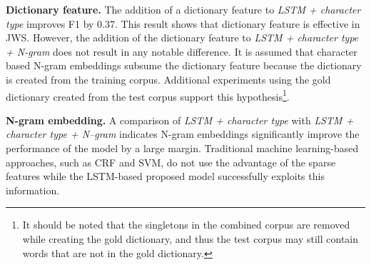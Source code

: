 \documentclass[11pt,letterpaper]{article}
\begin{document}
\noindent
{\bf Dictionary feature.} The addition of a dictionary feature to {\it LSTM + character type} improves F1 by 0.37. This result shows that dictionary feature is effective in JWS. However, the addition of the dictionary feature to {\it LSTM + character type + N-gram} does not result in any notable difference. It is assumed that character based N-gram embeddings subsume the dictionary feature because the dictionary is created from the training corpus. 
Additional experiments using the gold dictionary created from the test corpus support this hypothesis\footnote{It should be noted that the singletons in the combined corpus are removed while creating the gold dictionary, and thus the test corpus may still contain words that are not in the gold dictionary.}. 

\noindent
{\bf N-gram embedding.} A comparison of {\it LSTM + character type} with {\it LSTM + character type + N--gram} indicates N-gram embeddings significantly improve the performance of the model by a large margin. Traditional machine learning-based approaches, such as CRF and SVM, do not use the advantage of the sparse features while the LSTM-based proposed model successfully exploits this information.
\end{document}
